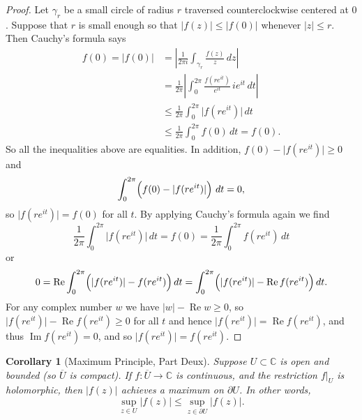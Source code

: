 \documentclass[12pt,openany]{book}
\renewcommand{\Re}{\operatorname{Re}}
\renewcommand{\Im}{\operatorname{Im}}
\newcommand{\sabs}[1]{\lvert {#1} \rvert}
\newcommand{\abs}[1]{\left\lvert {#1} \right\rvert}
\newcommand{\C}{{\mathbb{C}}}
\theoremstyle{plain}
\newtheorem{cor}[thm]{Corollary}
\theoremstyle{remark}
\theoremstyle{definition}
\theoremstyle{exercise}
\theoremstyle{example}
\begin{document}
\begin{proof}
Let $\gamma_r$ be a small circle of radius $r$ traversed counterclockwise
centered at $0$.  Suppose that $r$ is small enough so that
$\sabs{f(z)} \leq \sabs{f(0)}$ whenever $\sabs{z} \leq r$.
Then Cauchy's formula says
\begin{equation*}
\begin{split}
f(0) = \sabs{f(0)} & =
\abs{\frac{1}{2\pi i}
\int_{\gamma_r}
\frac{f(z)}{z} \, dz
}
\\
& =
\frac{1}{2\pi}
\abs{
\int_0^{2\pi}
\frac{f(re^{it})}{e^{it}} \, i e^{it} \, dt
}
\\
& \leq
\frac{1}{2\pi}
\int_0^{2\pi}
\sabs{f(re^{it})}\, dt
\\
&
\leq
\frac{1}{2\pi}
\int_0^{2\pi}
f(0)\, dt = f(0) .
\end{split}
\end{equation*}
So all the inequalities above are equalities.
In addition, $f(0)-\sabs{f(re^{it})} \geq 0$ and
\begin{equation*}
\int_0^{2\pi}\Bigl( f(0)-\sabs{f(re^{it})} \Bigr) \ dt = 0 ,
\end{equation*}
so $\sabs{f(re^{it})} = f(0)$ for all $t$.
By applying Cauchy's formula
again we find
\begin{equation*}
\frac{1}{2\pi}
\int_0^{2\pi}
\sabs{f(re^{it})}\, dt
=
f(0)
=
\frac{1}{2\pi}
\int_0^{2\pi}
f(re^{it})\, dt
\end{equation*}
or
\begin{equation*}
0 =
\Re \int_0^{2\pi}
\Bigl(\sabs{f(re^{it})}-f(re^{it})\Bigr)\, dt
=
\int_0^{2\pi}
\Bigl(\sabs{f(re^{it})}-\Re f(re^{it})\Bigr)\, dt .
\end{equation*}
For any complex number $w$ we have $\sabs{w} - \Re w \geq 0$, so
$\sabs{f(re^{it})}-\Re f(re^{it}) \geq 0$ for all $t$ and hence
$\sabs{f(re^{it})}=\Re f(re^{it})$, and thus $\Im f(re^{it}) = 0$,
and so 
$\sabs{f(re^{it})}=f(re^{it})$.
\end{proof}

\begin{cor}[Maximum Principle, Part Deux]
Suppose $U \subset \C$ is open and bounded (so $\overline{U}$ is compact).
If $f \colon \overline{U} \to \C$ is continuous, and the restriction $f|_{U}$
is holomorphic, then $\sabs{f(z)}$ achieves a maximum on $\partial U$.  In
other words,
\begin{equation*}
\sup_{z \in U} \sabs{f(z)} \leq
\sup_{z \in \partial U} \sabs{f(z)} .
\end{equation*}
\end{cor}
\end{document}
